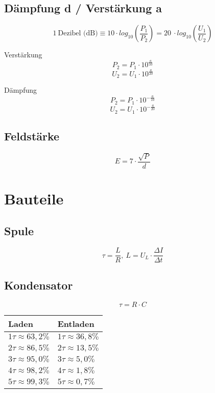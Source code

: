 \documentclass[10pt,landscape]{scrartcl}
\begin{document}
\begin{multicols}{3}
\subsection*{Dämpfung d / Verstärkung a}

$$ 1~\textrm{Dezibel (dB)} \equiv 10 \cdot log_{10}\left(\frac{P_{1}}{P_{2}}\right) = 20~\cdot log_{10}\left(\frac{U_{1}}{U_{2}}\right) $$

\noindent
\parbox[b][6em][t]{.5\columnwidth}{
\center Verstärkung
$$ P_2 = P_1 \cdot 10^\frac{a}{10}$$
$$ U_2 = U_1 \cdot 10^\frac{a}{20} $$
}
\noindent
\parbox[b][6em][t]{.5\columnwidth}{
\center Dämpfung
$$ P_2 = P_1 \cdot 10^{-\frac{a}{10}}$$
$$ U_2 = U_1 \cdot 10^{-\frac{a}{20}} $$
}

\subsection*{Feldstärke}

$$ E = 7 \cdot \frac{\sqrt{P}}{d} $$

\section{Bauteile}

\subsection*{Spule}

$$ \tau = \frac{L}{R},\ L = U_L \cdot \frac{\Delta I}{\Delta t} $$

\noindent
{}

\subsection*{Kondensator}

$$\tau = R\cdot C $$

\begin{center}
\begin{tabular}{|ll|}
\hline
Laden                   & Entladen \\
\hline
$1 \tau \approx 63,2\%$	& $1 \tau \approx 36,8\%$ \\
$2 \tau \approx 86,5\%$	& $2 \tau \approx 13,5\%$ \\
$3 \tau \approx 95,0\%$	& $3 \tau \approx 5,0\% $ \\
$4 \tau \approx 98,2\%$	& $4 \tau \approx 1,8\% $ \\
$5 \tau \approx 99,3\%$	& $5 \tau \approx 0,7\% $ \\
\hline
\end{tabular}
\end{center}


\end{multicols}
\end{document}
